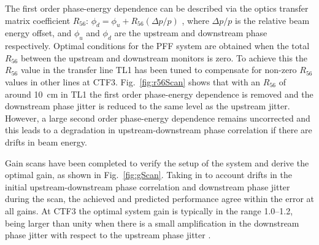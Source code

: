 \documentclass[%
 reprint,
superscriptaddress,
 amsmath,amssymb,
 prl,
]{revtex4-1}
\begin{document}
The first order phase-energy dependence can be described via the optics 
transfer matrix coefficient \(R_{56}\):
\(\phi_d = \phi_u + R_{56}(\Delta p / p)\)
, where \(\Delta p / p\) is the relative beam energy offset, and \(\phi_u\) and 
\(\phi_d\) are the upstream and downstream phase respectively.
Optimal conditions for the PFF system are obtained when the total \(R_{56}\) 
between the upstream and downstream monitors is zero.
To achieve this the \(R_{56}\) value in the transfer line TL1 has been tuned to 
compensate for non-zero \(R_{56}\) values in other lines at CTF3.
Fig.~\ref{fig:r56Scan} shows that with an \(R_{56}\) of around 10~cm in TL1 the 
first order phase-energy dependence is removed and the 
downstream phase jitter is reduced to the same level as the upstream jitter. 
However, a large second order phase-energy dependence remains uncorrected and 
this leads to a degradation in upstream-downstream phase correlation if there 
are drifts in beam energy. 

Gain scans have been completed to verify the setup of the system and derive the 
optimal gain, as shown in Fig.~\ref{fig:gScan}. 
Taking in to 
account drifts in the initial upstream-downstream phase correlation and 
downstream phase jitter during the scan, the achieved and predicted performance 
agree within the error at 
all gains. At CTF3 the optimal system gain is typically in the range 1.0--1.2, 
being larger than unity when there is a small amplification in the downstream 
phase jitter with respect to the upstream phase jitter \cite{RobertsThesis}.
\end{document}
